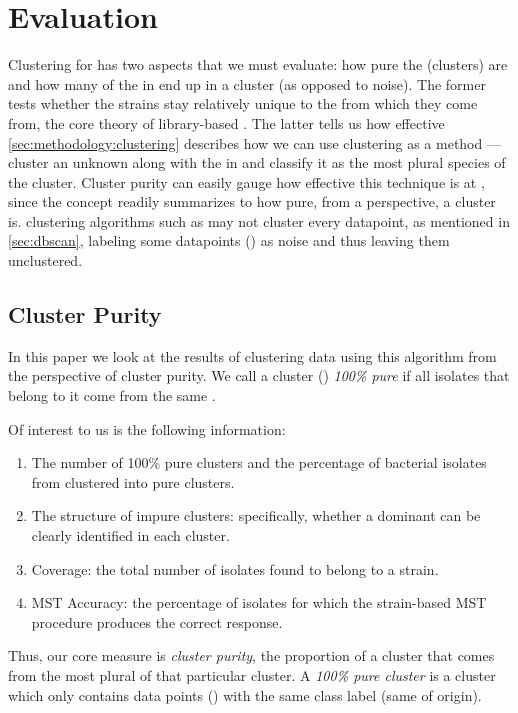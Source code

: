 \section{Evaluation}\label{sec:evaluation:clustering}
Clustering for \bslongs{} has two aspects that we must evaluate: how pure the \bslongs{} (clusters) are and how many of the \isols{} in \cplop{} end up in a cluster (as opposed to noise).
The former tests whether the \ecoli{} strains stay relatively unique to the \spec{} from which they come from, the core theory of library-based \mst{}.
The latter tells us how effective 
\autoref{sec:methodology:clustering} describes how we can use clustering as a \mst{} method --- cluster an unknown \isol{} along with the \isols{} in \cplop{} and classify it as the most plural species of the cluster.
Cluster purity can easily gauge how effective this technique is at \mst{}, since the concept readily summarizes to how pure, from a \spec{} perspective, a cluster is.
\Dbased{} clustering algorithms such as \dbscan{} may not cluster every datapoint, as mentioned in \autoref{sec:dbscan},  labeling some datapoints (\isols{}) as noise and thus leaving them unclustered.

\subsection{Cluster Purity}
In this paper we look at the results of clustering \cplop{} data using this algorithm from the perspective of cluster purity. We call a cluster (\bslong{}) \textit{100\% pure}
if all isolates that belong to it come from the same \spec{}. 

Of interest to us is the following information:
\begin{enumerate}
    \item The number of 100\% pure clusters and the percentage of bacterial isolates from \cplop{} clustered into pure clusters.
    \item The structure of impure clusters: specifically, whether a dominant \spec{} can
    be clearly identified in each cluster.
    \item Coverage: the total number of \cplop{} isolates found to belong to a strain.
    \item MST Accuracy: the percentage of isolates for which the strain-based MST procedure produces the correct response.
\end{enumerate}
Thus, our core measure is \textit{cluster purity}, the proportion of a cluster that comes from the most plural \spec{} of that particular cluster.
A \textit{100\% pure cluster} is a cluster which only contains data points (\isols{}) with the same class label (same \spec{} of origin). 

